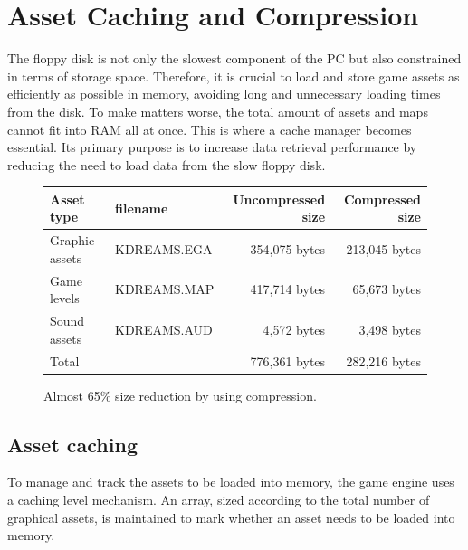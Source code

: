 \documentclass[book.tex]{subfiles}
\begin{document}
\label{chapter_cache_compression}
\section{Asset Caching and Compression}

The floppy disk is not only the slowest component of the PC but also constrained in terms of storage space. Therefore, it is crucial to load and store game assets as efficiently as possible in memory, avoiding long and unnecessary loading times from the disk. To make matters worse, the total amount of assets and maps cannot fit into RAM all at once. This is where a cache manager becomes essential. Its primary purpose is to increase data retrieval performance by reducing the need to load data from the slow floppy disk. \\

\begin{figure}[H]
\centering
{\renewcommand{\arraystretch}{1.2} %
\begin{tabularx}{\textwidth}{|X|X|r|r|}
  \hline
  \textbf{Asset type} & \textbf{filename} & \textbf{Uncompressed size} & \textbf{Compressed size}\\ \hline
  Graphic assets & KDREAMS.EGA & 354,075 bytes & 213,045 bytes \\
  Game levels & KDREAMS.MAP & 417,714 bytes & 65,673 bytes\\ 
  Sound assets & KDREAMS.AUD & 4,572 bytes & 3,498 bytes\\ \hline
  Total &  & 776,361 bytes & 282,216 bytes\\ \hline
\end{tabularx}
}
\caption{Almost 65\% size reduction by using compression\protect\footnotemark.}
\end{figure}

\addtocounter{footnote}{-1}





\subsection{Asset caching}
To manage and track the assets to be loaded into memory, the game engine uses a caching level mechanism. An array, sized according to the total number of graphical assets, is maintained to mark whether an asset needs to be loaded into memory. \\
\end{document}
